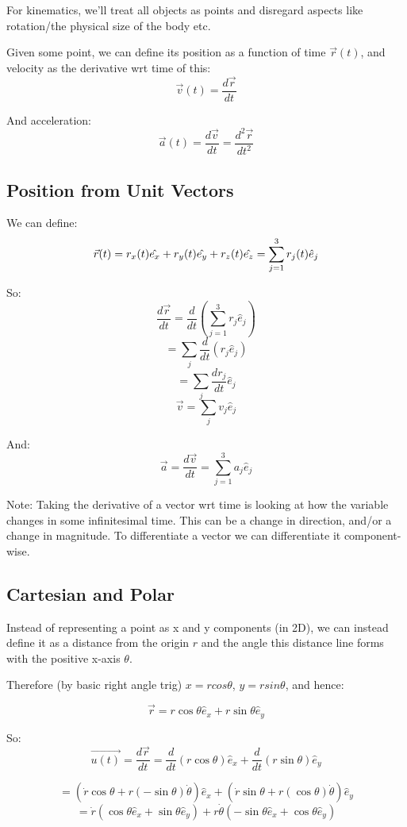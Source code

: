 For kinematics, we'll treat all objects as points and disregard aspects like rotation/the physical size of the body etc.

Given some point, we can define its position as a function of time $\vec{r}(t)$, and velocity as the derivative wrt time of this:
\[
    \vec{v}(t) = \frac{d \vec{r}}{dt}
\]

And acceleration:
\[
    \vec{a}(t) = \frac{d \vec{v}}{dt} =\frac{d^2 \vec{r}}{dt^2}
\]

\subsection{Position from Unit Vectors}
We can define:
\[
    \vec{r}(t) = r_x(t) \hat{e_x} + r_y(t) \hat{e_y} + r_z(t) \hat{e_z}\\
    = \sum_{j=1}^{3} r_j(t) \hat{e}_j
\]

So:
\[
    \frac{d \vec{r}}{dt} = \frac{d}{dt} \left(\sum_{j=1}^{3} r_j \hat{e}_j\right)
\]
\[
    = \sum_j \frac{d}{dt}(r_j \hat{e}_j)
\]
\[
    = \sum_j \frac{dr_j}{dt} \hat{e}_j
\]
\[
    \vec{v} = \sum_j v_j \hat{e}_j
\]

And:
\[
    \vec{a} = \frac{d \vec{v}}{dt} = \sum_{j=1}^{3} a_j \hat{e}_j
\]

Note: Taking the derivative of a vector wrt time is looking at how the variable changes in some infinitesimal time. This can be a change in direction, and/or a change in magnitude. To differentiate a vector we can differentiate it component-wise.

\subsection{Cartesian and Polar}
Instead of representing a point as x and y components (in 2D), we can instead define it as a distance from the origin $r$ and the angle this distance line forms with the positive x-axis $\theta$.

Therefore (by basic right angle trig) $x = rcos \theta$, $y = rsin \theta$, and hence:

\[
    \vec{r} = r \cos \theta \hat{e}_x + r \sin \theta \hat{e}_y
\]

So:
\[
    \vec{u(t)} = \frac{d \vec{r}}{dt} = \frac{d}{dt} (r \cos \theta) \hat{e}_x + \frac{d}{dt} (r \sin \theta) \hat{e}_y
\]

\[
    = \left(\dot{r}\cos \theta + r (-\sin \theta) \dot{\theta}\right) \hat{e}_x + \left(\dot{r} \sin \theta + r (\cos \theta) \dot{\theta}\right) \hat{e}_y
\]
\[
    = \dot{r} \left(\cos \theta \hat{e}_x + \sin \theta \hat{e}_y\right) + r \dot{\theta} \left(-\sin \theta \hat{e}_x + \cos \theta \hat{e}_y\right)
\]


